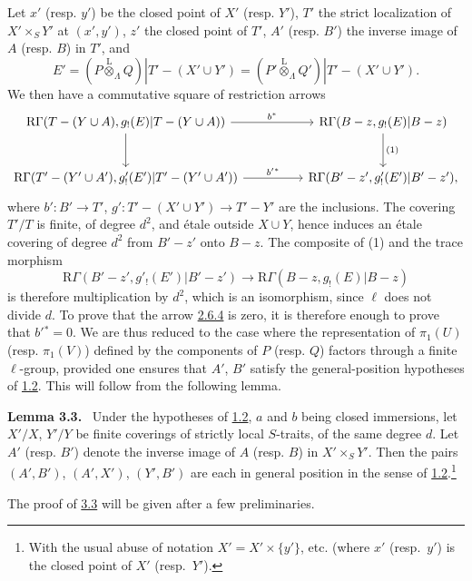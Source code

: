 \documentclass[11pt]{article}
\newenvironment{statement}[1]{\par\medskip\noindent\textbf{#1.}\ }{\par\medskip}
\providecommand{\lten}{\overset{\mathrm L}{\otimes}}
\providecommand{\lten}{\overset{\mathrm L}{\otimes}}
\providecommand{\lten}{\overset{\mathrm L}{\otimes}}
\providecommand{\lten}{\overset{\mathrm L}{\otimes}}
\providecommand{\lten}{\overset{\mathrm L}{\otimes}}
\providecommand{\lten}{\overset{\mathrm L}{\otimes}}
\providecommand{\lten}{\overset{\mathrm L}{\otimes}}
\begin{document}
Let $x'$ (resp. $y'$) be the closed point of $X'$ (resp. $Y'$), $T'$ the strict localization of $X'\times_S Y'$ at $(x',y')$, $z'$ the closed point of $T'$, $A'$ (resp. $B'$) the inverse image of $A$ (resp. $B$) in $T'$, and
\[
E'=(P\lten_{\Lambda}Q)|T'-(X'\cup Y')
   =(P'\lten_{\Lambda}Q')|T'-(X'\cup Y').
\]
We then have a commutative square of restriction arrows
\[
\begin{tikzcd}[column sep=huge,row sep=large]
\mathrm R\Gamma(T-(Y\cup A),g_!(E)|T-(Y\cup A))
 \arrow[r,"b^*"] \arrow[d]
&
\mathrm R\Gamma(B-z,g_!(E)|B-z) \arrow[d,"(1)"]\\
\mathrm R\Gamma(T'-(Y'\cup A'),g'_!(E')|T'-(Y'\cup A'))
 \arrow[r,"b'{}^*"]
&
\mathrm R\Gamma(B'-z',g'_!(E')|B'-z') ,
\end{tikzcd}
\]
where $b':B'\to T'$, $g':T'-(X'\cup Y')\to T'-Y'$ are the inclusions. The covering $T'/T$ is finite, of degree $d^2$, and étale outside $X\cup Y$, hence induces an étale covering of degree $d^2$ from $B'-z'$ onto $B-z$. The composite of (1) and the trace morphism
\[
\mathrm R\Gamma(B'-z',g'_!(E')|B'-z')
 \longrightarrow
\mathrm R\Gamma(B-z,g_!(E)|B-z)
\]
is therefore multiplication by $d^2$, which is an isomorphism, since $\ell$ does not divide $d$. To prove that the arrow \hyperref[sga5:IIIB:equation:2.6.4]{2.6.4} is zero, it is therefore enough to prove that $b'{}^*=0$. We are thus reduced to the case where the representation of $\pi_1(U)$ (resp. $\pi_1(V)$) defined by the components of $P$ (resp. $Q$) factors through a finite $\ell$-group, provided one ensures that $A'$, $B'$ satisfy the general-position hypotheses of \hyperref[sga5:IIIB:theorem:1.2]{1.2}. This will follow from the following lemma.

\label{sga5:IIIB:lemma:3.3}\begin{statement}{Lemma 3.3}
Under the hypotheses of \hyperref[sga5:IIIB:theorem:1.2]{1.2}, $a$ and $b$ being closed immersions, let $X'/X$, $Y'/Y$ be finite coverings of strictly local $S$-traits, of the same degree $d$. Let $A'$ (resp. $B'$) denote the inverse image of $A$ (resp. $B$) in $X'\times_S Y'$. Then the pairs $(A',B')$, $(A',X')$, $(Y',B')$ are each in general position in the sense of \hyperref[sga5:IIIB:theorem:1.2]{1.2}.\footnote{With the usual abuse of notation $X'=X'\times\{y'\}$, etc. (where $x'$ (resp.\ $y'$) is the closed point of $X'$ (resp.\ $Y'$).}
\end{statement}

The proof of \hyperref[sga5:IIIB:lemma:3.3]{3.3} will be given after a few preliminaries.
\end{document}
